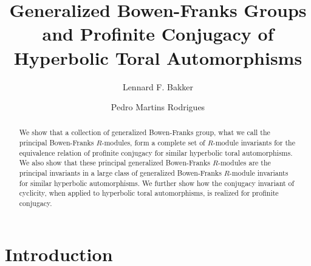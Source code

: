\documentclass{amsart}
\theoremstyle{plain}
\theoremstyle{definition}
\theoremstyle{remark}
\begin{document}
\title[Profinite Conjugacy]{Generalized Bowen-Franks Groups and Profinite Conjugacy of Hyperbolic Toral Automorphisms}

\author[Bakker]{Lennard F. Bakker}
\address{Department of Mathematics, Brigham Young University, Provo, Utah, USA}
\author[Martins Rodrigues]{Pedro Martins Rodrigues}
\address{Department of Mathematics, Instituto Superior T\'ecnico, Univ. Tec. Lisboa, Lisboa, Portugal}


\begin{abstract}
We show that a collection of generalized Bowen-Franks group, what we call the principal Bowen-Franks $R$-modules, form a complete set of $R$-module invariants for the equivalence relation of profinite conjugacy for similar hyperbolic toral automorphisms. We also show that these principal generalized Bowen-Franks $R$-modules are the principal invariants in a large class of generalized Bowen-Franks $R$-module invariants for similar hyperbolic automorphisms. We further show how the conjugacy invariant of cyclicity, when applied to hyperbolic toral automorphisms, is realized for profinite conjugacy.
\end{abstract}

\maketitle


\section{Introduction}
\end{document}
